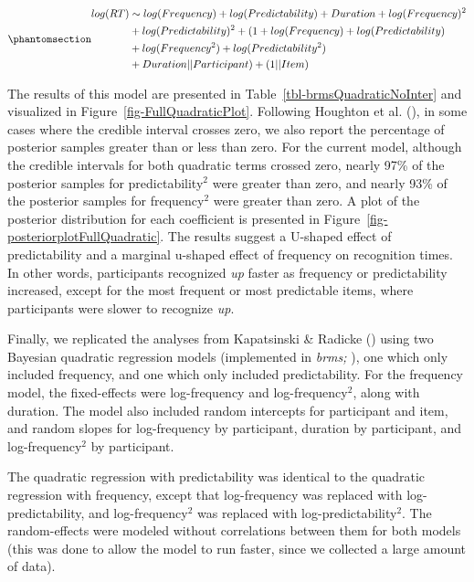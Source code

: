 \documentclass[
  12pt,
  letterpaper,
]{scrreprt}
\begin{document}
\begin{equation}\phantomsection\label{eq-BayesianFullModelSyntax}{
\begin{aligned}
log(RT) & \sim  log(Frequency) + log(Predictability) + Duration + log(Frequency)^2  \\ & + log(Predictability)^2 + (1 + log(Frequency) + log(Predictability) \\ & + log(Frequency^2) + log(Predictability^2) \\ & + Duration || Participant) + (1 || Item)
\end{aligned}
}\end{equation}

The results of this model are presented in
Table~\ref{tbl-brmsQuadraticNoInter} and visualized in
Figure~\ref{fig-FullQuadraticPlot}. Following Houghton et al.
(),
in some cases where the credible interval crosses zero, we also report
the percentage of posterior samples greater than or less than zero. For
the current model, although the credible intervals for both quadratic
terms crossed zero, nearly 97\% of the posterior samples for
predictability\(^2\) were greater than zero, and nearly 93\% of the
posterior samples for frequency\(^2\) were greater than zero. A plot of
the posterior distribution for each coefficient is presented in
Figure~\ref{fig-posteriorplotFullQuadratic}. The results suggest a
U-shaped effect of predictability and a marginal u-shaped effect of
frequency on recognition times. In other words, participants recognized
\emph{up} faster as frequency or predictability increased, except for
the most frequent or most predictable items, where participants were
slower to recognize \emph{up}.

Finally, we replicated the analyses from Kapatsinski \& Radicke
() using
two Bayesian quadratic regression models (implemented in \emph{brms;}
), one which
only included frequency, and one which only included predictability. For
the frequency model, the fixed-effects were log-frequency and
log-frequency\(^2\), along with duration. The model also included random
intercepts for participant and item, and random slopes for log-frequency
by participant, duration by participant, and log-frequency\(^2\) by
participant.

The quadratic regression with predictability was identical to the
quadratic regression with frequency, except that log-frequency was
replaced with log-predictability, and log-frequency\(^2\) was replaced
with log-predictability\(^2\). The random-effects were modeled without
correlations between them for both models (this was done to allow the
model to run faster, since we collected a large amount of data).
\end{document}
